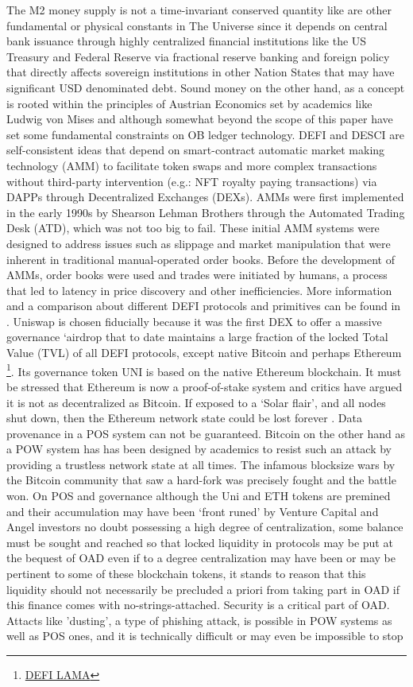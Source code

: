 \documentclass[final,5p,times,twocolumn,authoryear]{elsarticle}
\begin{document}
The M2 money supply is not a time-invariant conserved quantity like are other fundamental or physical constants in The Universe since it depends on central bank issuance through highly centralized financial institutions like the US Treasury and Federal Reserve via fractional reserve banking and foreign policy that directly affects sovereign institutions in other Nation States that may have significant USD denominated debt. Sound money on the other hand, as a concept is rooted within the principles of Austrian Economics set by academics like Ludwig von Mises  \cite{Hansen2020Book} and although somewhat beyond the scope of this paper have set some fundamental constraints on OB ledger technology. 
DEFI and DESCI are self-consistent ideas that depend on smart-contract automatic market making technology (AMM) to facilitate token swaps and more complex transactions without third-party intervention (e.g.: NFT royalty paying transactions) via DAPPs through Decentralized Exchanges (DEXs). AMMs were first implemented in the early 1990s by Shearson Lehman Brothers through the Automated Trading Desk (ATD), which was not too big to fail. These initial AMM systems were designed to address issues such as slippage and market manipulation that were inherent in traditional manual-operated order books. Before the development of AMMs, order books were used and trades were initiated by humans, a process that led to latency in price discovery and other inefficiencies. More information and a comparison about different DEFI protocols and primitives can be found in \cite{2023arXiv230805282J}. Uniswap is chosen fiducially because it was the first DEX to offer a massive governance `airdrop that to date maintains a large fraction of the locked Total Value (TVL) of all DEFI protocols, except native Bitcoin and perhaps Ethereum \footnote{\href{https://defillama.com/protocols/dexes}{DEFI LAMA}}. Its governance token UNI is based on the native Ethereum blockchain. It must be stressed that Ethereum is now a proof-of-stake system and critics have argued it is not as decentralized as Bitcoin. If exposed to a `Solar flair', and all nodes shut down, then the Ethereum network state could be lost forever \cite{Alden2023}.  Data provenance in a POS system can not be guaranteed. Bitcoin on the other hand as a POW system has has been designed by academics to resist such an attack by providing a trustless network state at all times. The infamous blocksize wars by the Bitcoin community that saw a hard-fork was precisely fought and the battle won. On POS and governance although the Uni and ETH tokens are premined and their accumulation may have been `front runed' by Venture Capital and Angel investors no doubt possessing a high degree of centralization, some balance must be sought and reached so that locked liquidity in protocols may be put at the bequest of OAD even if to a degree centralization may have been or may be pertinent to some of these blockchain tokens, it stands to reason that this liquidity should not necessarily be precluded a priori from taking part in OAD if this finance comes with no-strings-attached. Security is a critical part of OAD. Attacts like 'dusting', a type of phishing attack, is possible in POW systems as well as POS ones, and it is technically difficult or may even be impossible to stop 
\end{document}

